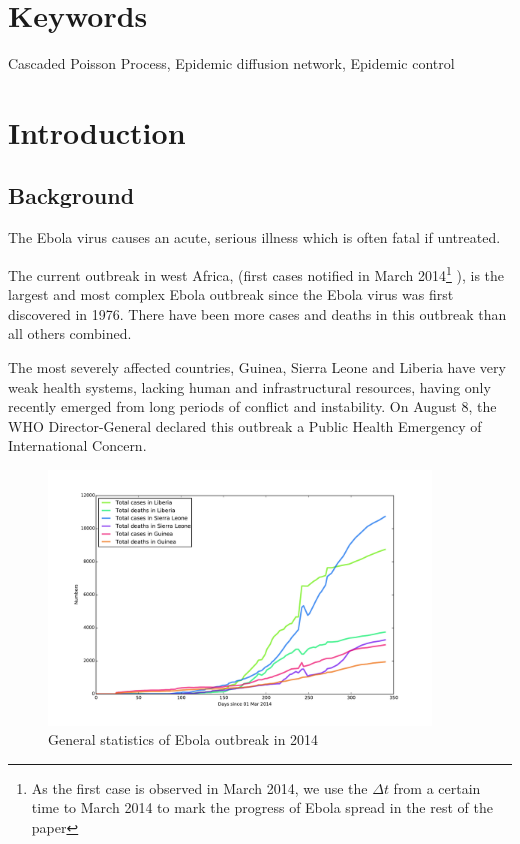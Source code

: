 \documentclass[11pt]{article}
\begin{document}
\section*{Keywords}
Cascaded Poisson Process, Epidemic diffusion network, Epidemic control


\newpage


\tableofcontents

\newpage





\section{Introduction}
\subsection{Background}




The Ebola virus causes an acute, serious illness which is often fatal if untreated. 

The current outbreak in west Africa, (first cases notified in March 2014\footnote{As the first case is observed in March 2014, we use the $\Delta t$ from a certain time to March 2014 to mark the progress of Ebola spread in the rest of the paper} ), is the largest and most complex Ebola outbreak since the Ebola virus was first discovered in 1976. There have been more cases and deaths in this outbreak than all others combined. 

The most severely affected countries, Guinea, Sierra Leone and Liberia have very weak health systems, lacking human and infrastructural resources, having only recently emerged from long periods of conflict and instability. On August 8, the WHO Director-General declared this outbreak a Public Health Emergency of International Concern.


\begin{figure}[hbtp]
\begin{center}
  \includegraphics[width=4in]{graph/bstats.pdf}
  \caption{General statistics of Ebola outbreak in 2014}
  \label{stats}
\end{center}  
\end{figure}
\end{document}
